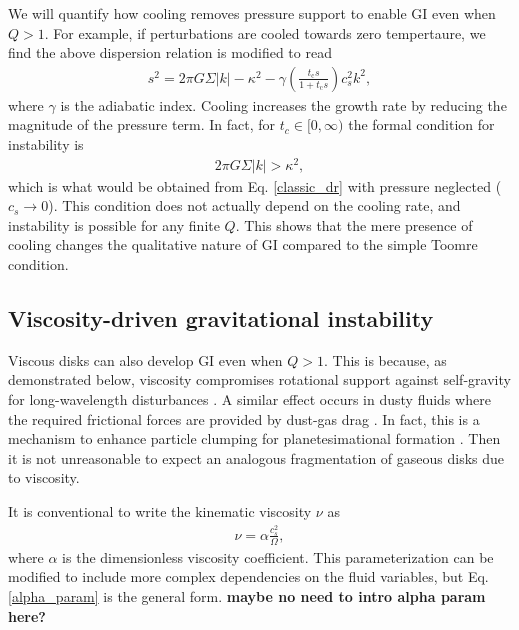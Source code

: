 \documentclass[iop, numberedappendix]{emulateapj}
\newcommand{\tcool}{t_\mathrm{c}}
\begin{document}
We will quantify how cooling removes pressure support to enable GI
even when $Q>1$. For example, if perturbations are
cooled towards zero tempertaure, we find the above dispersion relation is
modified to read 
\begin{align}\label{cool_dr}
s^2 = 2\pi G\Sigma |k| - \kappa^2 - \gamma \left(\frac{\tcool s}{1 +
  \tcool s}\right)c_s^2k^2,
\end{align}
where $\gamma$ is the adiabatic index. Cooling increases the growth
rate by reducing the magnitude of the 
pressure term. In fact, for $t_c\in[0,\infty)$ the formal condition
for instability is  
\begin{align*}
  2\pi G \Sigma |k| > \kappa^2,
\end{align*}
which is what would be obtained from Eq. \ref{classic_dr} with 
pressure neglected ($c_s\to 0$). This condition does not actually
depend on the cooling rate, and instability is
possible for any finite $Q$. %
This shows that the mere presence of
cooling changes the qualitative nature of GI compared to the simple
Toomre condition.   




\subsection{Viscosity-driven gravitational instability}\label{visc_gi}
Viscous disks can also develop GI even when $Q>1$. This is because, as 
demonstrated below, viscosity compromises rotational support against  
self-gravity for long-wavelength disturbances 
\citep{lynden-bell74,willerding92,gammie96}. A similar effect   
occurs in dusty fluids where the required frictional forces are 
provided by dust-gas drag \citep{ward00, takahashi14}. 
In fact, this
is a mechanism to enhance particle clumping for planetesimational
formation %
\citep{youdin11}. Then it is not unreasonable to expect an analogous
fragmentation of gaseous disks due to viscosity.   

It is conventional to write the kinematic viscosity $\nu$ as   
\begin{align}\label{alpha_param}
  \nu  = \alpha \frac{c_s^2}{\Omega}, %
\end{align}
where $\alpha$ is the dimensionless viscosity
coefficient. This
parameterization can be modified to include more complex dependencies on the
fluid variables, but Eq. \ref{alpha_param} is the general form. 
{\bf maybe no need to intro alpha param here?}
\end{document}
